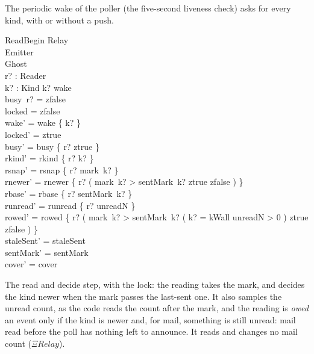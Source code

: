 \documentclass[a4paper,10pt,fleqn]{article}
\begin{document}
The periodic wake of the poller (the five-second liveness check) asks for every
kind, with or without a push.

\begin{schema}{ReadBegin}
  \Xi Relay \\
  \Delta Emitter \\
  \Xi Ghost \\
  r? : Reader \\
  k? : Kind
  \where
  k? \in wake \\
  busy~r? = zfalse \\
  locked = zfalse \\
  wake' = wake \setminus \{ k? \} \\
  locked' = ztrue \\
  busy' = busy \oplus \{ r? \mapsto ztrue \} \\
  rkind' = rkind \oplus \{ r? \mapsto k? \} \\
  rsnap' = rsnap \oplus \{ r? \mapsto mark~k? \} \\
  rnewer' = rnewer \oplus
    \{ r? \mapsto ( \IF mark~k? > sentMark~k? \THEN ztrue \ELSE zfalse ) \} \\
  rbase' = rbase \oplus \{ r? \mapsto sentMark~k? \} \\
  runread' = runread \oplus \{ r? \mapsto unreadN \} \\
  rowed' = rowed \oplus
    \{ r? \mapsto ( \IF mark~k? > sentMark~k? \land
         ( k? = kWall \lor unreadN > 0 ) \THEN ztrue \ELSE zfalse ) \} \\
  staleSent' = staleSent \\
  sentMark' = sentMark \\
  cover' = cover
\end{schema}

The read and decide step, with the lock: the reading takes the mark, and decides
the kind newer when the mark passes the last-sent one.  It also samples the unread
count, as the code reads the count after the mark, and the reading is \emph{owed}
an event only if the kind is newer and, for mail, something is still unread:
mail read before the poll has nothing left to announce.  It reads and changes no
mail count ($\Xi Relay$).
\end{document}
